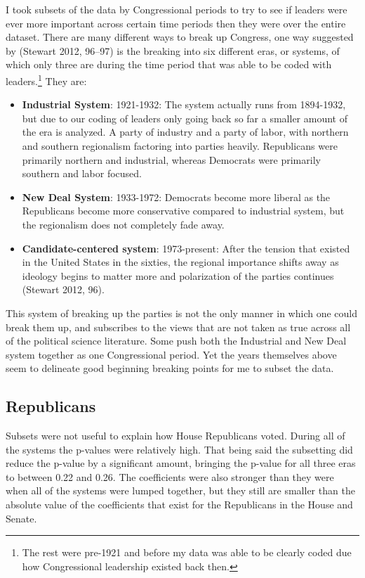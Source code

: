 \documentclass[12pt,twoside]{reedthesis}
\begin{document}
  I took subsets of the data by Congressional periods to try to see if
  leaders were ever more important across certain time periods then they
  were over the entire dataset. There are many different ways to break up
  Congress, one way suggested by (Stewart 2012, 96--97) is the breaking
  into six different eras, or systems, of which only three are during the
  time period that was able to be coded with
  leaders.\footnote{The rest were pre-1921 and before my data was able to be clearly coded due how Congressional leadership existed back then.}
  They are:
  
  \begin{itemize}
  \itemsep1pt\parskip0pt
  \item
    \textbf{Industrial System}: 1921-1932: The system actually runs from
    1894-1932, but due to our coding of leaders only going back so far a
    smaller amount of the era is analyzed. A party of industry and a party
    of labor, with northern and southern regionalism factoring into
    parties heavily. Republicans were primarily northern and industrial,
    whereas Democrats were primarily southern and labor focused.
  \item
    \textbf{New Deal System}: 1933-1972: Democrats become more liberal as
    the Republicans become more conservative compared to industrial
    system, but the regionalism does not completely fade away.
  \item
    \textbf{Candidate-centered system}: 1973-present: After the tension
    that existed in the United States in the sixties, the regional
    importance shifts away as ideology begins to matter more and
    polarization of the parties continues (Stewart 2012, 96).
  \end{itemize}
  
  This system of breaking up the parties is not the only manner in which
  one could break them up, and subscribes to the views that are not taken
  as true across all of the political science literature. Some push both
  the Industrial and New Deal system together as one Congressional period.
  Yet the years themselves above seem to delineate good beginning breaking
  points for me to subset the data.
  
  \subsection{Republicans}\label{republicans-1}
  
  Subsets were not useful to explain how House Republicans voted. During
  all of the systems the p-values were relatively high. That being said
  the subsetting did reduce the p-value by a significant amount, bringing
  the p-value for all three eras to between 0.22 and 0.26. The
  coefficients were also stronger than they were when all of the systems
  were lumped together, but they still are smaller than the absolute value
  of the coefficients that exist for the Republicans in the House and
  Senate.
  
\end{document}
